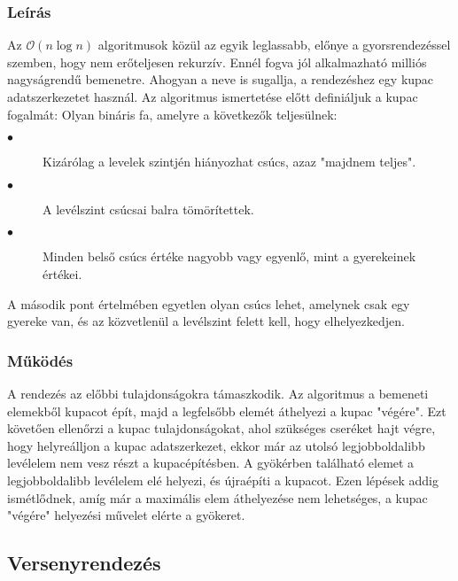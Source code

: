 \documentclass{elteikthesis}
\begin{document}
\subsubsection{Leírás}
Az $\mathcal{O}(n\log n)$ algoritmusok közül az egyik leglassabb, előnye a gyorsrendezéssel szemben, hogy nem erőteljesen rekurzív. Ennél fogva jól alkalmazható milliós nagyságrendű bemenetre. Ahogyan a neve is sugallja, a rendezéshez egy kupac adatszerkezetet használ. Az algoritmus ismertetése előtt definiáljuk a kupac fogalmát\cite{Fekete}:
Olyan bináris fa, amelyre a következők teljesülnek:
\begin{description}
	\item[$\bullet$] Kizárólag a levelek szintjén hiányozhat csúcs, azaz "majdnem teljes".
	\item[$\bullet$] A levélszint csúcsai balra tömörítettek.
	\item[$\bullet$] Minden belső csúcs értéke nagyobb vagy egyenlő, mint a gyerekeinek értékei.
\end{description}
A második pont értelmében egyetlen olyan csúcs lehet, amelynek csak egy gyereke van, és az közvetlenül a levélszint felett kell, hogy elhelyezkedjen.\par
\subsubsection{Működés}
A rendezés az előbbi tulajdonságokra támaszkodik. 
Az algoritmus a bemeneti elemekből kupacot épít, majd a legfelsőbb elemét áthelyezi a kupac "végére". Ezt követően ellenőrzi a kupac tulajdonságokat, ahol szükséges cseréket hajt végre, hogy helyreálljon a kupac adatszerkezet, ekkor már az utolsó legjobboldalibb levélelem nem vesz részt a kupacépítésben. A gyökérben található elemet a legjobboldalibb levélelem elé helyezi, és újraépíti a kupacot. Ezen lépések addig ismétlődnek, amíg már a maximális elem áthelyezése nem lehetséges, a kupac "végére" helyezési művelet elérte a gyökeret.\par

\subsection{Versenyrendezés}
\end{document}
